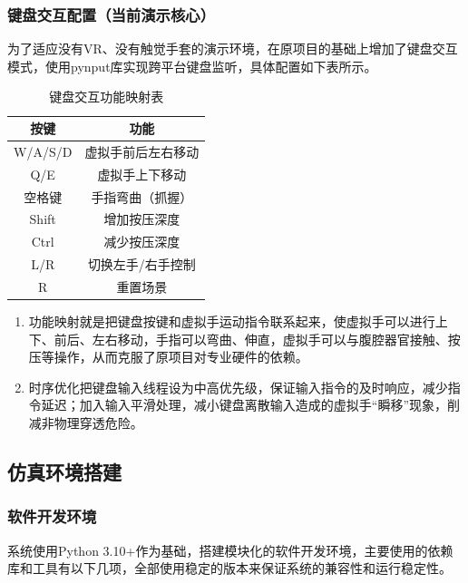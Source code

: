\subsubsection{键盘交互配置（当前演示核心）}
为了适应没有VR、没有触觉手套的演示环境，在原项目的基础上增加了键盘交互模式，使用pynput库实现跨平台键盘监听，具体配置如下表所示。

\begin{table}[H]
    \centering
    \caption{键盘交互功能映射表}
    \label{tab:keyboard}
    \begin{tabular}{|c|c|}
        \hline
        \textbf{按键} & \textbf{功能} \\
        \hline
        W/A/S/D & 虚拟手前后左右移动 \\
        \hline
        Q/E & 虚拟手上下移动 \\
        \hline
        ​空格键 & 手指弯曲（抓握） \\
        \hline
        Shift & 增加按压深度 \\
        \hline
        Ctrl & 减少按压深度 \\
        \hline
        L/R & 切换左手/右手控制 \\
        \hline
        R & 重置场景 \\
        \hline
    \end{tabular}
\end{table}

\begin{enumerate}
    \item 功能映射就是把键盘按键和虚拟手运动指令联系起来，使虚拟手可以进行上下、前后、左右移动，手指可以弯曲、伸直，虚拟手可以与腹腔器官接触、按压等操作，从而克服了原项目对专业硬件的依赖。
    
    \item 时序优化把键盘输入线程设为中高优先级，保证输入指令的及时响应，减少指令延迟；加入输入平滑处理，减小键盘离散输入造成的虚拟手“瞬移”现象，削减非物理穿透危险。
\end{enumerate}

\subsection{仿真环境搭建}

\subsubsection{软件开发环境}
系统使用Python 3.10+作为基础，搭建模块化的软件开发环境，主要使用的依赖库和工具有以下几项，全部使用稳定的版本来保证系统的兼容性和运行稳定性。

